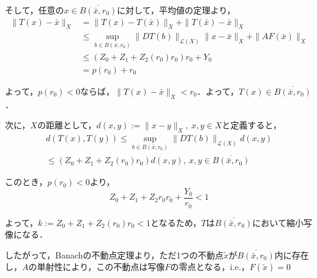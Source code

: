 \documentclass[11pt,a4paper,titlepage]{jsreport}
\theoremstyle{definition}
\begin{document}
そして，任意の$x\in \overline{B(\bar{x},r_0)}$に対して，平均値の定理より，
\begin{align*}
  \|T(x)-\bar{x}\|_X & = \|T(x)-T(\bar{x})\|_X + \|T(\bar{x}) - \bar{x}\|_X                                           \\
                     & \leq \sup_{b\in B(\bar{x},r_0)} \|DT(b)\|_{\mathcal{L}(X)} \|x-\bar{x}\|_X + \|AF(\bar{x})\|_X \\
                     & \leq (Z_0 + Z_1 + Z_2(r_0)r_0) r_0 + Y_0                                                       \\
                     & = p(r_0)+r_0
\end{align*}

よって，$p(r_0)<0$ならば，$\|T(x)-\bar{x}\|_X<r_0$．よって，$T(x)\in\overline{B(\bar{x},r_0)}$．

次に，$X$の距離として，$d(x,y):=\|x-y\|_X,\ x,y\in X$と定義すると，
\begin{align*}
  d(T(x),T(y))\leq \sup_{b\in B(\bar{x},r_0)} \|DT(b)\|_{\mathcal{L}(X)} d(x,y) \\
  \leq (Z_0 + Z_1 + Z_2(r_0)r_0) d(x,y),\ x,y\in \overline{B(\bar{x},r_0)}
\end{align*}

このとき，$p(r_0)<0$より，
\begin{equation*}
  Z_0 + Z_1 + Z_2{r_0}r_0 + \frac{Y_0}{r_0} < 1
\end{equation*}

よって，$k:=Z_0+Z_1+Z_2(r_0)r_0<1$となるため，$T$は$\overline{B(\bar{x},r_0)}$において縮小写像になる．

したがって，Banachの不動点定理より，ただ1つの不動点$\tilde{x}$が$\overline{B(\bar{x},r_0)}$内に存在し，$A$の単射性により，この不動点は写像$F$の零点となる，$\mathrm{i.e.}，F(\tilde{x})=0$

\end{document}
